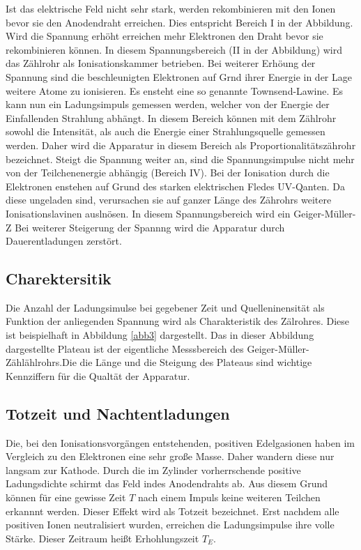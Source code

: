 \documentclass[11pt,ngerman,a4paper]{article}
\begin{document}
\noindent
Ist das elektrische Feld nicht sehr stark, werden rekombinieren mit den Ionen bevor sie den Anodendraht erreichen. Dies entspricht Bereich I in der Abbildung. Wird die Spannung erh\"oht erreichen mehr Elektronen den Draht bevor sie rekombinieren k\"onnen. In diesem Spannungsbereich (II in der Abbildung) wird das Z\"ahlrohr als Ionisationskammer betrieben. Bei weiterer Erh\"oung der Spannung sind  die beschleunigten Elektronen auf Grnd ihrer Energie in der Lage weitere Atome zu ionisieren. Es ensteht eine so genannte Townsend-Lawine. Es kann nun ein Ladungsimpuls gemessen werden, welcher von der Energie der Einfallenden Strahlung abh\"angt. In diesem Bereich k\"onnen mit dem Z\"ahlrohr sowohl die Intensit\"at, als auch die Energie einer Strahlungsquelle gemessen werden. Daher wird die Apparatur in diesem Bereich als Proportionalit\"atsz\"ahrohr bezeichnet. 
Steigt die Spannung weiter an, sind die Spannungsimpulse nicht mehr von der Teilchenenergie abh\"angig (Bereich IV). Bei der Ionisation durch die Elektronen enstehen auf Grund des starken elektrischen Fledes UV-Qanten. Da diese ungeladen sind, verursachen sie auf ganzer L\"ange des Z\"ahrohrs weitere Ionisationslavinen ausln\"osen. In diesem Spannungsbereich wird ein Geiger-M\"uller-Z
Bei weiterer Steigerung der Spannng wird die Apparatur durch Dauerentladungen zerst\"ort.
\subsection{Charektersitik}
Die Anzahl der Ladungsimulse bei gegebener Zeit und Quelleninensit\"at als Funktion der anliegenden Spannung wird als Charakteristik des Z\"alrohres. Diese ist beispielhaft in Abbildung \ref{abb3} dargestellt. Das in dieser Abbildung dargestellte Plateau ist der eigentliche Messsbereich des Geiger-M\"uller-Z\"ahl\"ahlrohrs.Die die L\"ange und die Steigung des Plateaus sind wichtige Kennziffern f\"ur die Qualt\"at der Apparatur.
 
\subsection{Totzeit und Nachtentladungen}

Die, bei den Ionisationsvorg\"angen entstehenden, positiven Edelgasionen haben im Vergleich zu den Elektronen eine sehr große Masse. Daher wandern diese nur langsam zur Kathode. Durch die im Zylinder vorherrschende positive Ladungsdichte schirmt das Feld indes Anodendrahts ab. Aus diesem Grund k\"onnen f\"ur eine gewisse Zeit $T$ nach einem Impuls keine weiteren Teilchen erkannnt werden. Dieser Effekt wird als Totzeit bezeichnet. Erst nachdem alle positiven Ionen neutralisiert wurden, erreichen die Ladungsimpulse ihre volle St\"arke. Dieser Zeitraum heißt Erhohlungszeit $T_E$.
\end{document}
